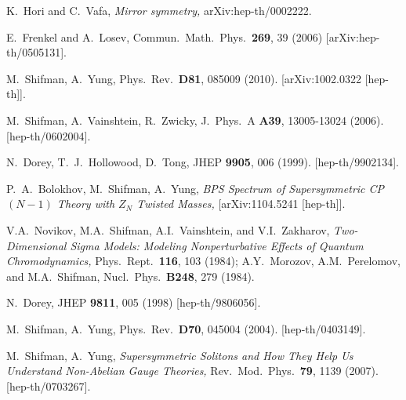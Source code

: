 \documentclass[epsfig,12pt]{article}
\begin{document}
\begin{thebibliography}{99}




  K.~Hori and C.~Vafa,
{\em Mirror symmetry,}
  arXiv:hep-th/0002222.
  
E.~Frenkel and A.~Losev,
  Commun.\ Math.\ Phys.\  {\bf 269}, 39 (2006)
  [arXiv:hep-th/0505131].
  
  M.~Shifman, A.~Yung,
  Phys.\ Rev.\  {\bf D81}, 085009 (2010).
  [arXiv:1002.0322 [hep-th]].

  M.~Shifman, A.~Vainshtein, R.~Zwicky,
  J.\ Phys.\ A {\bf A39}, 13005-13024 (2006).
  [hep-th/0602004].
  
  
  N.~Dorey, T.~J.~Hollowood, D.~Tong,
  JHEP {\bf 9905}, 006 (1999).
  [hep-th/9902134].

P.~A.~Bolokhov, M.~Shifman, A.~Yung,
{\em BPS Spectrum of Supersymmetric {\rm CP}$(N-1)$ Theory with $Z_N$ Twisted Masses,}
    [arXiv:1104.5241 [hep-th]].
    
  V.A.~Novikov, M.A.~Shifman, A.I.~Vainshtein, and V.I.~Zakharov,
 {\em Two-Dimensional Sigma Models: Modeling Nonperturbative Effects of Quantum Chromodynamics,}
  Phys.\ Rept.\  {\bf 116}, 103 (1984);  A.Y.~Morozov, A.M.~Perelomov, and M.A.~Shifman,
  Nucl.\ Phys.\  {\bf B248}, 279 (1984).
  
N.~Dorey,
JHEP {\bf 9811}, 005 (1998) [hep-th/9806056].

  M.~Shifman, A.~Yung,
  Phys.\ Rev.\  {\bf D70}, 045004 (2004).
  [hep-th/0403149].

  M.~Shifman, A.~Yung,
{\em Supersymmetric Solitons and How They Help Us Understand Non-Abelian Gauge Theories,}
  Rev.\ Mod.\ Phys.\  {\bf 79}, 1139 (2007).
  [hep-th/0703267].

\end{thebibliography}
\end{document}
